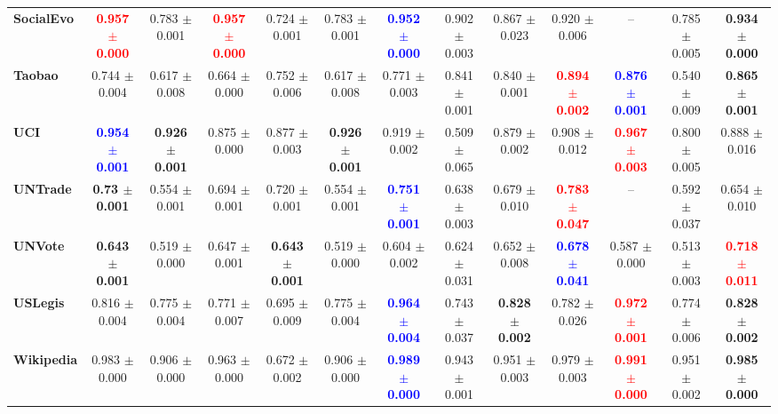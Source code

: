 {\begin{tabular}{lccccc|ccccccc}
\textbf{SocialEvo} 
& \textcolor{red}{\textbf{0.957 $\pm$ 0.000 }}
& 0.783 $\pm$ 0.001 
& \textcolor{red}{\textbf{0.957 $\pm$ 0.000 }}
& 0.724 $\pm$ 0.001 
& 0.783 $\pm$ 0.001 
& \textcolor{blue}{\textbf{0.952 $\pm$ 0.000 }}
& 0.902 $\pm$ 0.003 
& 0.867 $\pm$ 0.023 
& 0.920 $\pm$ 0.006 
& -- 
& 0.785 $\pm$ 0.005 
& \textbf{0.934 $\pm$ 0.000 } \\
\textbf{Taobao} 
& 0.744 $\pm$ 0.004 
& 0.617 $\pm$ 0.008 
& 0.664 $\pm$ 0.000 
& 0.752 $\pm$ 0.006 
& 0.617 $\pm$ 0.008 
& 0.771 $\pm$ 0.003 
& 0.841 $\pm$ 0.001
& 0.840 $\pm$ 0.001
& \textcolor{red}{\textbf{0.894 $\pm$ 0.002 }}
& \textcolor{blue}{\textbf{0.876 $\pm$ 0.001 }}
& 0.540 $\pm$ 0.009 
& \textbf{0.865 $\pm$ 0.001 }  \\
\textbf{UCI} 
& \textcolor{blue}{\textbf{0.954 $\pm$ 0.001 }}
& \textbf{0.926 $\pm$ 0.001 }
& 0.875 $\pm$ 0.000 
& 0.877 $\pm$ 0.003 
& \textbf{0.926 $\pm$ 0.001 }
& 0.919 $\pm$ 0.002 
& 0.509 $\pm$ 0.065 
& 0.879 $\pm$ 0.002 
& 0.908 $\pm$ 0.012 
& \textcolor{red}{\textbf{0.967 $\pm$ 0.003 }}
& 0.800 $\pm$ 0.005 
& 0.888 $\pm$ 0.016  \\
\textbf{UNTrade} 
& \textbf{0.73 $\pm$ 0.001 }
& 0.554 $\pm$ 0.001 
& 0.694 $\pm$ 0.001 
& 0.720 $\pm$ 0.001 
& 0.554 $\pm$ 0.001 
& \textcolor{blue}{\textbf{0.751 $\pm$ 0.001 }}
& 0.638 $\pm$ 0.003 
& 0.679 $\pm$ 0.010 
& \textcolor{red}{\textbf{0.783 $\pm$ 0.047 }}
& -- 
& 0.592 $\pm$ 0.037 
& 0.654 $\pm$ 0.010  \\
\textbf{UNVote} 
& \textbf{0.643 $\pm$ 0.001 }
& 0.519 $\pm$ 0.000 
& 0.647 $\pm$ 0.001 
& \textbf{0.643 $\pm$ 0.001 }
& 0.519 $\pm$ 0.000 
& 0.604 $\pm$ 0.002 
& 0.624 $\pm$ 0.031 
& 0.652 $\pm$ 0.008 
& \textcolor{blue}{\textbf{0.678 $\pm$ 0.041 }}
& 0.587 $\pm$ 0.000 
& 0.513 $\pm$ 0.003 
& \textcolor{red}{\textbf{0.718 $\pm$ 0.011 }} \\
\textbf{USLegis} 
& 0.816 $\pm$ 0.004 
& 0.775 $\pm$ 0.004 
& 0.771 $\pm$ 0.007 
& 0.695 $\pm$ 0.009 
& 0.775 $\pm$ 0.004 
& \textcolor{blue}{\textbf{0.964 $\pm$ 0.004 }}
& 0.743 $\pm$ 0.037 
& \textbf{0.828 $\pm$ 0.002 }
& 0.782 $\pm$ 0.026 
& \textcolor{red}{\textbf{0.972 $\pm$ 0.001 }}
& 0.774 $\pm$ 0.006 
& \textbf{0.828 $\pm$ 0.002 } \\
\textbf{Wikipedia} 
& 0.983 $\pm$ 0.000 
& 0.906 $\pm$ 0.000 
& 0.963 $\pm$ 0.000 
& 0.672 $\pm$ 0.002 
& 0.906 $\pm$ 0.000 
& \textcolor{blue}{\textbf{0.989 $\pm$ 0.000 }}
& 0.943 $\pm$ 0.001 
& 0.951 $\pm$ 0.003 
& 0.979 $\pm$ 0.003 
& \textcolor{red}{\textbf{0.991 $\pm$ 0.000 }}
& 0.951 $\pm$ 0.002 
& \textbf{0.985 $\pm$ 0.000 } \\
\bottomrule
\end{tabular}
}
